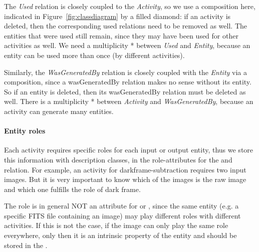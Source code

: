 The \emph{Used} relation is closely coupled to the \emph{Activity}, so we use a composition here, indicated
in Figure~\ref{fig:classdiagram} by a filled diamond: 
if an activity is deleted, then the corresponding used relations need to be removed as well. 
The entities that were used still remain, since they may have been used for other activities as well.
We need a multiplicity * between \emph{Used} and \emph{Entity}, because an entity can be used more than once
(by different activities).

Similarly, the \emph{WasGeneratedBy} relation is closely coupled with the \emph{Entity} via a composition,
since a wasGeneratedBy relation makes no sense without its entity. So if an entity is deleted, 
then its wasGeneratedBy relation must be deleted as well. There is a multiplicity * between \emph{Activity}
and \emph{WasGeneratedBy}, because an activity can generate many entities.


\paragraph{Entity roles}\label{sec:entity-roles}
Each activity requires specific roles for each input or output entity, thus 
we store this information with description classes, in the role-attributes for 
the  and  relation.
For example, an activity for darkframe-subtraction requires two input images. But it is 
very important to know which of the images is the raw image and 
which one fulfills the role of dark frame.

The role is in general NOT an attribute for  or , 
since the same entity (e.g. a specific FITS file containing an image) may play 
different roles with different activities. If this is not the case, if the 
image can only play the same role everywhere, only then it is an intrinsic 
property of the entity and should be stored in the .


